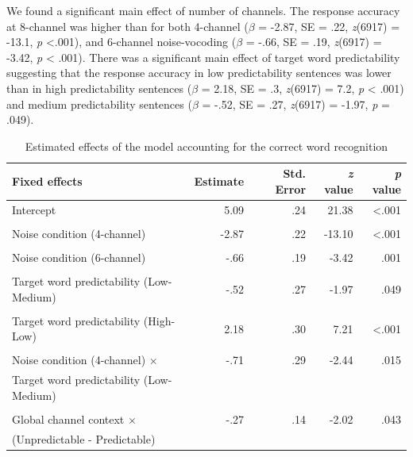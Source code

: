 \documentclass[a4paper, nobind]{templates/ociamthesis}
\begin{document}
We found a significant main effect of number of channels.
The response accuracy at 8-channel was higher than for both 4-channel
(\(\beta\) = -2.87, SE = .22, \emph{z}(6917) = -13.1, \emph{p} \textless.001),
and 6-channel noise-vocoding (\(\beta\) = -.66, SE = .19, \emph{z}(6917) = -3.42, \emph{p} \textless{} .001).
There was a significant main effect of target word predictability suggesting that
the response accuracy in low predictability sentences was lower than in high predictability sentences
(\(\beta\) = 2.18, SE = .3, \emph{z}(6917) = 7.2, \emph{p} \textless{} .001) and medium predictability sentences
(\(\beta\) = -.52, SE = .27, \emph{z}(6917) = -1.97, \emph{p} = .049).

\begin{table}[ht]
\begin{center}
\caption{Estimated effects of the model accounting for the correct word recognition}
\label{results2} 
\vskip 0.12in
\begin{tabular}[]{@{}lrrrr@{}}
\toprule
Fixed effects & Estimate & Std. Error & \emph{z} value & \emph{p}
value \\
\midrule
Intercept & 5.09 & .24 & 21.38 & \textless.001 \\
\\
Noise condition (4-channel) & -2.87 & .22 & -13.10 & \textless.001 \\
\\
Noise condition (6-channel) & -.66 & .19 & -3.42 & .001 \\
\\
Target word predictability (Low-Medium) & -.52 & .27 & -1.97 & .049 \\
\\
Target word predictability (High-Low) & 2.18 & .30 & 7.21 & \textless.001 \\
\\
Noise condition (4-channel) $\times$ & -.71 & .29 & -2.44 & .015 \\
Target word predictability (Low-Medium) \\
\\
Global channel context $\times$ & -.27 & .14 & -2.02 & .043 \\
(Unpredictable - Predictable) \\
\bottomrule
\end{tabular} 
\end{center} 
\end{table}
\end{document}
